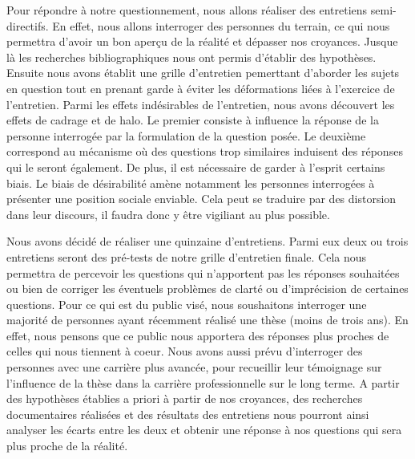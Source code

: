 \documentclass[12pt]{article}
\begin{document}
Pour répondre à notre questionnement, nous allons réaliser des entretiens semi-directifs. En effet, nous allons interroger des personnes du terrain, ce qui nous permettra d'avoir un bon aperçu de la réalité et dépasser nos croyances. Jusque là les recherches bibliographiques nous ont permis d'établir des hypothèses. Ensuite nous avons établit une grille d'entretien pemerttant d'aborder les sujets en question tout en prenant garde à éviter les déformations liées à l'exercice de l'entretien. Parmi les effets indésirables de l'entretien, nous avons découvert les effets de cadrage et de halo. Le premier consiste à influence la réponse de la personne interrogée par la formulation de la question posée. Le deuxième correspond au mécanisme où des questions trop similaires induisent des réponses qui le seront également. De plus, il est nécessaire de garder à l'esprit certains biais. Le biais de désirabilité amène notamment les personnes interrogées à présenter une position sociale enviable. Cela peut se traduire par des distorsion dans leur discours, il faudra donc y être vigiliant au plus possible.

Nous avons décidé de réaliser une quinzaine d'entretiens. Parmi eux deux ou trois entretiens seront des pré-tests de notre grille d'entretien finale. Cela nous permettra de percevoir les questions qui n'apportent pas les réponses souhaitées ou bien de corriger les éventuels problèmes de clarté ou d'imprécision de certaines questions. Pour ce qui est du public visé, nous soushaitons interroger une majorité de personnes ayant récemment réalisé une thèse (moins de trois ans). En effet, nous pensons que ce public nous apportera des réponses plus proches de celles qui nous tiennent à coeur. Nous avons aussi prévu d'interroger des personnes avec une carrière plus avancée, pour recueillir leur témoignage sur l'influence de la thèse dans la carrière professionnelle sur le long terme. A partir des hypothèses établies a priori à partir de nos croyances, des recherches documentaires réalisées et des résultats des entretiens nous pourront ainsi analyser les écarts entre les deux et obtenir une réponse à nos questions qui sera plus proche de la réalité.
\end{document}
